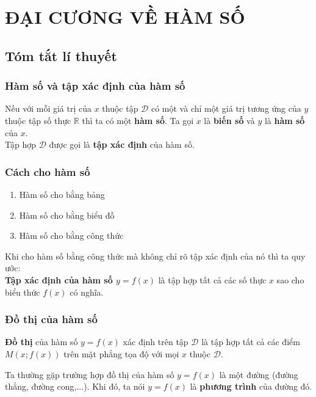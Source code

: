 \section{ĐẠI CƯƠNG VỀ HÀM SỐ}
\subsection{Tóm tắt lí thuyết}
\subsubsection{Hàm số và tập xác định của hàm số}
\begin{dn}
Nếu với mỗi giá trị của $x$ thuộc tập $\mathcal{D}$ có một và chỉ một giá trị tương ứng của $y$ thuộc tập số thực $\mathbb{R}$ thì ta có một \textbf{hàm số}. Ta gọi $x$ là \textbf{biến số} và $y$ là \textbf{hàm số} của $x$.\\
Tập hợp $\mathcal{D}$ được gọi là \textbf{tập xác định} của hàm số.
\end{dn}
\subsubsection{Cách cho hàm số}

\begin{enumerate}
	\item Hàm số cho bằng bảng
	\item Hàm số cho bằng biểu đồ
	\item Hàm số cho bằng công thức
\end{enumerate}

\begin{note}
Khi cho hàm số bằng công thức mà không chỉ rõ tập xác định của nó thì ta quy ước:\\
\textbf{Tập xác định của hàm số $y=f(x)$} là tập hợp tất cả các số thực $x$ sao cho biểu thức $f(x)$ có nghĩa.
\end{note}

\subsubsection{Đồ thị của hàm số}
\begin{dn}
\textbf{Đồ thị} của hàm số $y=f(x)$ xác định trên tập $\mathcal{D}$ là tập hợp tất cả các điểm $M\left(x;f(x)\right)$ trên mặt phẳng tọa độ với mọi $x$ thuộc $\mathcal{D}$.
\end{dn}

Ta thường gặp trường hợp đồ thị của hàm số $y=f(x)$ là một đường (đường thẳng, đường cong,...). Khi đó, ta nói $y=f(x)$ là \textbf{phương trình} của đường đó.

